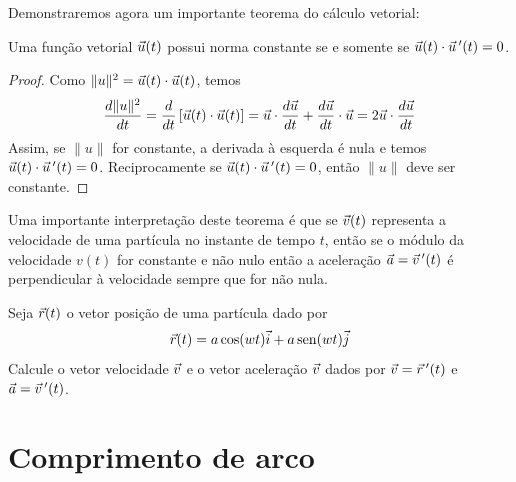 Demonstraremos agora um importante teorema do cálculo vetorial:
\begin{teo}\label{teodernormacst} Uma função vetorial $\vec{u}(t)$ possui norma constante se e somente se $\vec{u}(t)\cdot\vec{u}\!~'(t)=0$. 
\end{teo}
\begin{proof} Como $\|u\|^2=\vec{u}(t)\cdot\vec{u}(t)$, temos
$$\frac{d \|u\|^2}{dt}=\frac{d}{dt}\left[\vec{u}(t)\cdot\vec{u}(t)\right]=\vec{u}\cdot\frac{d\vec{u}}{dt}+\frac{d\vec{u}}{dt}\cdot\vec{u}=2\vec{u}\cdot\frac{d\vec{u}}{dt}$$
Assim, se $\|u\|$ for constante, a derivada à esquerda é nula e temos $\vec{u}(t)\cdot\vec{u}\!~'(t)=0$. Reciprocamente se $\vec{u}(t)\cdot\vec{u}\!~'(t)=0$, então $\|u\|$ deve ser constante.
\end{proof}
\begin{obs} Uma importante interpretação deste teorema é que se $\vec{v}(t)$ representa a velocidade de uma partícula no instante de tempo $t$, então se o módulo da velocidade $v(t)$ for constante e não nulo então a aceleração $\vec{a}=\vec{v}\!~'(t)$ é perpendicular à velocidade sempre que for não nula.  
\end{obs}




\begin{ex}Seja $\vec{r}(t)$ o vetor posição de uma partícula dado por
$$\vec{r}(t)=a\cos(wt)\vec{i}+a\operatorname{sen}(wt)\vec{j}$$
Calcule o vetor velocidade $\vec{v}$ e o vetor aceleração $\vec{v}$ dados por $\vec{v}=\vec{r}~\!'(t)$ e $\vec{a}=\vec{v}~\!'(t)$.
\end{ex}



 
 \section{Comprimento de arco}
  
